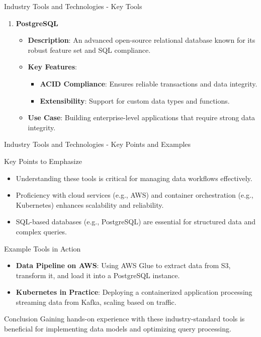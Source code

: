 \documentclass[aspectratio=169]{beamer}
\begin{document}
\begin{frame}[fragile]{Industry Tools and Technologies - Key Tools}
\begin{enumerate}
    \item \textbf{PostgreSQL}
      \begin{itemize}
        \item \textbf{Description}: An advanced open-source relational database known for its robust feature set and SQL compliance.
        \item \textbf{Key Features}:
          \begin{itemize}
            \item \textbf{ACID Compliance}: Ensures reliable transactions and data integrity.
            \item \textbf{Extensibility}: Support for custom data types and functions.
          \end{itemize}
        \item \textbf{Use Case}: Building enterprise-level applications that require strong data integrity.
      \end{itemize}
  \end{enumerate}
\end{frame}

\begin{frame}[fragile]{Industry Tools and Technologies - Key Points and Examples}
  \begin{block}{Key Points to Emphasize}
    \begin{itemize}
      \item Understanding these tools is critical for managing data workflows effectively.
      \item Proficiency with cloud services (e.g., AWS) and container orchestration (e.g., Kubernetes) enhances scalability and reliability.
      \item SQL-based databases (e.g., PostgreSQL) are essential for structured data and complex queries.
    \end{itemize}
  \end{block}

  \begin{block}{Example Tools in Action}
    \begin{itemize}
      \item \textbf{Data Pipeline on AWS}: Using AWS Glue to extract data from S3, transform it, and load it into a PostgreSQL instance.
      \item \textbf{Kubernetes in Practice}: Deploying a containerized application processing streaming data from Kafka, scaling based on traffic.
    \end{itemize}
  \end{block}

  \begin{block}{Conclusion}
    Gaining hands-on experience with these industry-standard tools is beneficial for implementing data models and optimizing query processing.
  \end{block}
\end{frame}
\end{document}
